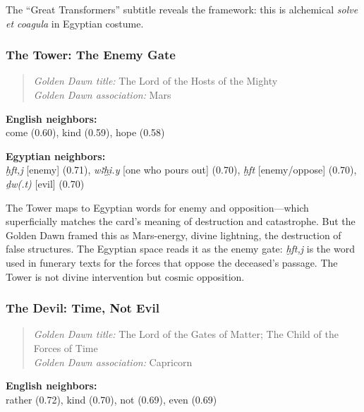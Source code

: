 \documentclass[11pt, a4paper]{article}
\begin{document}
The ``Great Transformers'' subtitle reveals the framework: this is alchemical \textit{solve et coagula} in Egyptian costume.

\subsubsection{The Tower: The Enemy Gate}

\begin{quote}
\textit{Golden Dawn title:} The Lord of the Hosts of the Mighty \\
\textit{Golden Dawn association:} Mars
\end{quote}

\noindent\textbf{English neighbors:}\\
\hspace{1em}come (0.60), kind (0.59), hope (0.58)

\noindent\textbf{Egyptian neighbors:}\\
\hspace{1em}\textit{ḫft,j} [enemy] (0.71), \textit{wꜣḫi̯.y} [one who pours out] (0.70), \textit{ḫft} [enemy/oppose] (0.70), \textit{ḏw(.t)} [evil] (0.70)

\vspace{6pt}
 The Tower maps to Egyptian words for enemy and opposition---which superficially matches the card's meaning of destruction and catastrophe. But the Golden Dawn framed this as Mars-energy, divine lightning, the destruction of false structures. The Egyptian space reads it as the enemy gate: \textit{ḫft,j} is the word used in funerary texts for the forces that oppose the deceased's passage. The Tower is not divine intervention but cosmic opposition.

\subsubsection{The Devil: Time, Not Evil}

\begin{quote}
\textit{Golden Dawn title:} The Lord of the Gates of Matter; The Child of the Forces of Time \\
\textit{Golden Dawn association:} Capricorn
\end{quote}

\noindent\textbf{English neighbors:}\\
\hspace{1em}rather (0.72), kind (0.70), not (0.69), even (0.69)
\end{document}
